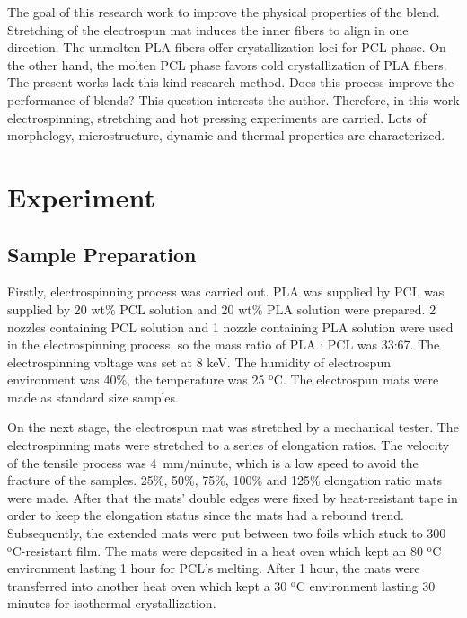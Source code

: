 \documentclass{Head}
\begin{document}
  The goal of this research work to improve the physical properties of the blend. 
  Stretching of the electrospun mat induces the inner fibers to align in one direction. 
  The unmolten PLA fibers offer crystallization loci for PCL phase.
  On the other hand, the molten PCL phase favors cold crystallization of PLA fibers.
  The present works lack this kind research method.
  Does this process improve the performance of blends? This question interests the author.
  Therefore, in this work electrospinning, stretching and hot pressing experiments are carried.
  Lots of morphology, microstructure, dynamic and thermal properties are characterized.
\label{sec:introduction}
  
\section{Experiment}
  \subsection{Sample Preparation} %
   \label{sub:sample_preparation}
   Firstly, electrospinning process was carried out.
   PLA was supplied by %
   PCL was supplied by %
   20 wt\% PCL solution and 20 wt\% PLA solution were prepared. 
   2 nozzles containing PCL solution and 1 nozzle containing PLA solution were used in the electrospinning process, 
   so the mass ratio of PLA : PCL was  33:67.
   The electrospinning voltage was set at 8 keV.
   The humidity of electrospun environment was 40\%, the temperature was 25 $\mathrm{^o C}$. %
   The electrospun mats were made as standard size samples.


   On the next stage, the electrospun mat was stretched by a mechanical tester. 
   The electrospinning mats were stretched to a series of elongation ratios. 
   The velocity of the tensile process was 4 mm/minute, which is a low speed to avoid the fracture of the samples.
   25\%, 50\%, 75\%, 100\% and 125\% elongation ratio mats were made.
   After that the mats' double edges were fixed by heat-resistant tape in order to keep the elongation status since the mats had a rebound trend.
   Subsequently, the extended mats were put between two foils which stuck to 300 $\mathrm{^o C}$-resistant film. 
   The mats were deposited in a heat oven which kept an 80 $\mathrm{^o C}$ environment lasting 1 hour for PCL's melting.
   After 1 hour, the mats were transferred into another heat oven which kept a 30 $\mathrm{^o C}$ environment lasting 30 minutes for isothermal crystallization.
\end{document}
